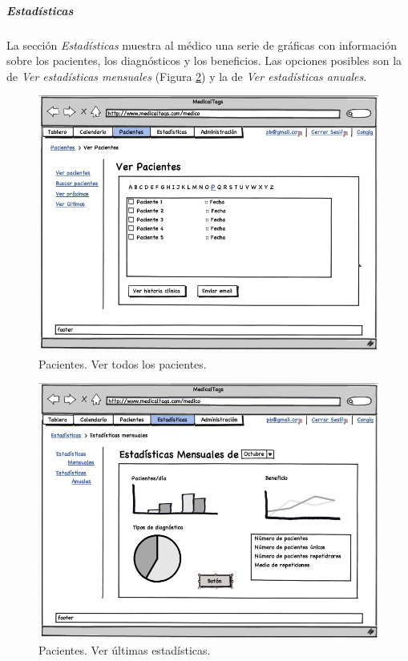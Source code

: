 			
		
		
		
		
		\subparagraph{Estadísticas} %
		\label{par:medico_estadisticas}
		
		La sección \textit{Estadísticas} muestra al médico una serie de gráficas con información sobre los pacientes, los diagnósticos y los beneficios. Las opciones posibles son la de \textit{Ver estadísticas mensuales} (Figura \ref{fig:iu_estadisticas_medico}) y la de  \textit{Ver estadísticas anuales}.
					
		\begin{figure}[H]
		  \centering
		    \includegraphics[width=12cm]{img/png/interfaz/17_Pacientes_Medico.png}
		  \caption{Pacientes. Ver todos los pacientes.}
		  \label{fig:iu_pacientes_medico}
		\end{figure}
		
		\begin{figure}[H]
		  \centering
		    \includegraphics[width=12cm]{img/png/interfaz/19_Estadisticas_Medicos.png}
		  \caption{Pacientes. Ver últimas estadísticas.}
		  \label{fig:iu_estadisticas_medico}
		\end{figure}
		
